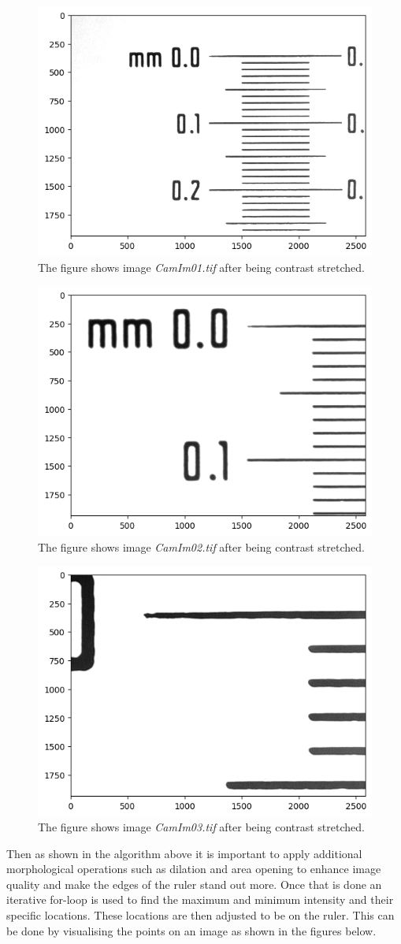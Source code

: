 \documentclass{article}
\begin{document}
\begin{figure}[h!]
\centering
\includegraphics[width=0.4\linewidth]{Report/Images/contrasted_1.png}
\caption{\label{fig:cam1_contrasted}The figure shows image \emph{CamIm01.tif} after being contrast stretched.}
\end{figure}

\begin{figure}[h!]
\centering
\includegraphics[width=0.4\linewidth]{Report/Images/contrasted_2.png}
\caption{\label{fig:cam2_contrasted}The figure shows image \emph{CamIm02.tif} after being contrast stretched.}
\end{figure}

\begin{figure}[h!]
\centering
\includegraphics[width=0.4\linewidth]{Report/Images/contrasted_3.png}
\caption{\label{fig:cam3_contrasted}The figure shows image \emph{CamIm03.tif} after being contrast stretched.}
\end{figure}

Then as shown in the algorithm above it is important to apply additional morphological operations such as dilation and area opening to enhance image quality and make the edges of the ruler stand out more. \newline
Once that is done an iterative for-loop is used to find the maximum and minimum intensity and their specific locations. These locations are then adjusted to be on the ruler. This can be done by visualising the points on an image as shown in the figures below. \newline
\end{document}
